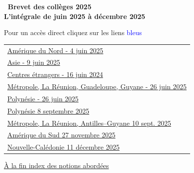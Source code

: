 \documentclass[11pt]{article}
\begin{document}
\setlength\parindent{0mm}

\pagestyle{fancy}
\thispagestyle{empty}
\begin{center} {\Large \textbf{\decofourleft~Brevet des collèges 2025~\decofourright\\\vspace{1cm} L'intégrale de juin 2025 à décembre 2025}}

\vspace{1cm}

Pour un accès direct cliquez sur les liens {\Large \textcolor{blue}{bleus}}
\end{center}

\label{sommaire}
\hypertarget{sommaire}{}

\begin{tabularx}{\linewidth}{>{\Large}X}
\hyperlink{AmeriqueduNord}{Amérique du Nord - 4 juin 2025}\dotfill \pageref{AmeriqueduNord} \\[7pt]
\hyperlink{Asie}{Asie - 9 juin 2025} \dotfill \pageref{Asie} \\[7pt]
\hyperlink{Etranger}{Centres étrangers - 16 juin 2024} \dotfill \pageref{Etranger} \\[7pt]
\hyperlink{Metropole}{Métropole, La Réunion, Guadeloupe, Guyane - 26 juin 2025} \dotfill \pageref{Metropole}\\[7pt]
\hyperlink{Polynesie}{Polynésie - 26 juin 2025} \dotfill \pageref{Polynesie} \\[7pt]
\hyperlink{Polynesiesep}{Polynésie 8 septembre 2025} \dotfill \pageref{Polynesiesep} \\[7pt]
\hyperlink{Metropolesep}{Métropole, La Réunion, Antilles--Guyane 10 sept. 2025} \dotfill \pageref{Metropolesep} \\
\hyperlink{AmeriqueSud}{Amérique du Sud 27 novembre 2025}  \dotfill \pageref{AmeriqueSud} \\[7pt]
\hyperlink{Caledoniedec}{Nouvelle-Calédonie 11 décembre 2025}  \dotfill \pageref{Caledoniedec}
\end{tabularx}

\vspace{1cm}

\hyperlink{Index}{À la fin index des notions abordées}

\newpage
~
\newpage

\end{document}
